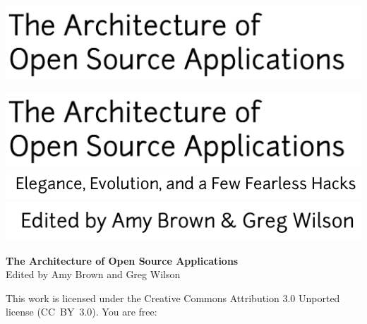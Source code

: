 \newpage

\thispagestyle{empty}
\hspace{-2cm}\includegraphics[width=400pt]{../images/frontmatter/title.pdf} 

\newpage

\thispagestyle{empty}
\mbox{}    %

\newpage

\thispagestyle{empty}
\hspace{-2cm}\includegraphics[width=400pt]{../images/frontmatter/title.pdf} 
\\
\vspace{0.5cm}
\hspace{2.8cm}\includegraphics{../images/frontmatter/subtitle.pdf}
\\[13.5cm]
\vspace{0.5cm}
\hspace{6.5cm}\includegraphics{../images/frontmatter/eds.pdf}

\newpage

\thispagestyle{empty}

\small
\noindent \textbf{The Architecture of Open Source Applications} \\
Edited by Amy Brown and Greg Wilson

\vspace{0.15cm}

\noindent
This work is licensed under the Creative Commons Attribution 3.0
Unported license (CC~BY~3.0).  You are free:

